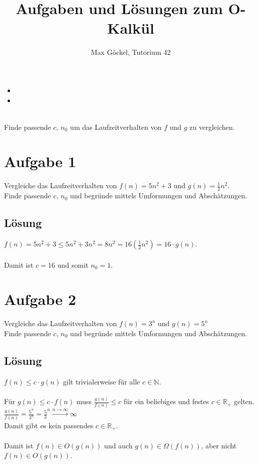 \documentclass[11pt]{article} %
\title{Aufgaben und Lösungen zum O-Kalkül}
\author{Max Göckel, Tutorium 42}
\begin{document}
\maketitle


\begin{itemize}
	\item 
	\item 
\end{itemize}
\ \\
Finde passende $c$, $n_0$ um das Laufzeitverhalten von $f$ und $g$ zu vergleichen.
\section{Aufgabe 1}

Vergleiche das Laufzeitverhalten von $f(n) = 5n^2 + 3$ und $g(n) = \frac{1}{2} n^2$.\\
Finde passende $c$, $n_0$ und begründe mittels Umformungen und Abschätzungen.

\subsection{Lösung}

$f(n) = 5n^2 + 3 \leq 5n^2 + 3n^2 = 8n^2 = 16(\frac{1}{2} n^2) = 16 \cdot g(n)$.\\
\ \\
Damit ist $c = 16$ und somit $n_0 = 1$.


\section{Aufgabe 2}

Vergleiche das Laufzeitverhalten von $f(n) = 3^n$ und $g(n) = 5^n$\\
Finde passende $c$, $n_0$ und begründe mittels Umformungen und Abschätzungen.


\subsection{Lösung}

$f(n) \leq c \cdot g(n)$ gilt trivialerweise für alle $c \in \mathbb{N}$.\\
\ \\
Für $g(n) \leq  c \cdot f(n)$ muss $\frac{ g(n) }{ f(n) } \leq c$ für ein beliebiges und festes $c \in \mathbb{R}_+$ gelten.\\

$\frac{ g(n) }{ f(n) } = \frac{ 5^n }{ 3^n } = \frac{5}{3}^n \xrightarrow{\text{$n \rightarrow \infty$}} \infty $\\
Damit gibt es kein passendes $c \in \mathbb{R}_+$.\\
\ \\
Damit ist $f(n) \in O( g(n) )$ und auch $g(n) \in \Omega( f(n) )$, aber nicht $f(n) \in O( g(n) )$.
\end{document}
